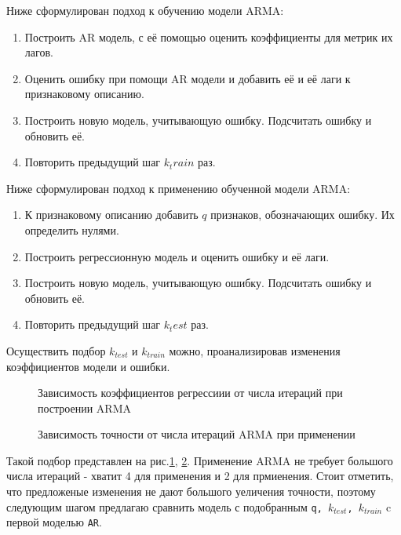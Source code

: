 \documentclass[14pt, a4paper]{extarticle}
\begin{document}
	Ниже сформулирован подход к обучению модели ARMA:
	\begin{enumerate}
		\item Построить AR модель, с её помощью оценить коэффициенты для метрик их лагов.
		\item Оценить ошибку при помощи AR модели и добавить её и её лаги к признаковому описанию.
		\item Построить новую модель, учитывающую ошибку. Подсчитать ошибку и обновить её.
		\item Повторить предыдущий шаг $k_train$ раз.
	\end{enumerate}
	
	Ниже сформулирован подход к применению обученной модели ARMA:
	\begin{enumerate}
		\item К признаковому описанию добавить $q$ признаков, обозначающих ошибку. Их определить нулями.
		\item Построить регрессионную модель и оценить ошибку и её лаги.
		\item Построить новую модель, учитывающую ошибку. Подсчитать ошибку и обновить её.
		\item Повторить предыдущий шаг $k_test$ раз.
	\end{enumerate}
	
	Осуществить подбор $k_{test}$ и $k_{train}$ можно, проанализировав изменения коэффициентов модели и ошибки.

	\begin{figure}[!htb]
		\centerline{}
		\caption{Зависимость коэффициентов регрессиии от числа итераций при построении ARMA}
		\label{fig:k_train_search}
	\end{figure}	
	
	\begin{figure}[!htb]
		\centerline{}
		\caption{Зависимость точности от числа итераций ARMA при применении}
		\label{fig:k_test_search}
	\end{figure}	
	
	
	Такой подбор представлен на рис.\ref{fig:k_train_search}, \ref{fig:k_test_search}.
	Применение ARMA не требует большого числа итераций - хватит 4 для применения и 2 для прмиенения.
	Стоит отметить, что предложеные изменения не дают большого уеличения точности, поэтому следующим шагом предлагаю сравнить модель с подобранным \texttt{q, $k_{test}$, $k_{train}$} c первой моделью \texttt{AR}.
	
\end{document}
